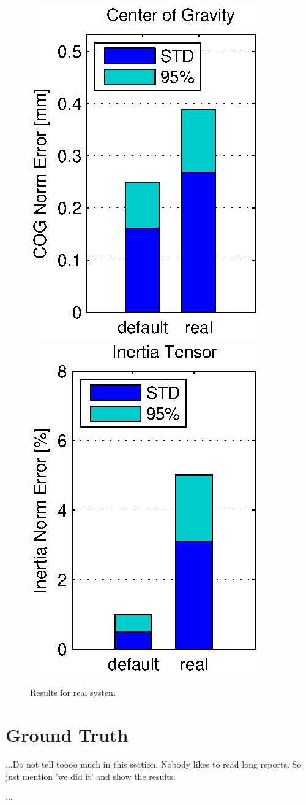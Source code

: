 \begin{figure}[hbtp]
\includegraphics[scale=.72]{images/results/err_cmp_real_cog.eps}
\includegraphics[scale=.72]{images/results/err_cmp_real_tensor.eps}
\caption{Results for real system}
\label{fig:err_cmp_real}
\end{figure}


\section{Ground Truth}
...Do not tell toooo much in this section. Nobody likes to read long reports. So just mention 'we did it' and show the results.

...